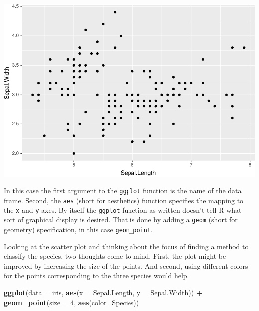 \documentclass[]{krantz}
\makeatletter
\newenvironment{Shaded}{\begin{snugshade}}{\end{snugshade}}
\newcommand{\DataTypeTok}[1]{\textcolor[rgb]{0.27,0.27,0.27}{#1}}
\newcommand{\DecValTok}[1]{\textcolor[rgb]{0.06,0.06,0.06}{#1}}
\newcommand{\KeywordTok}[1]{\textcolor[rgb]{0.27,0.27,0.27}{\textbf{#1}}}
\newcommand{\NormalTok}[1]{#1}
\newcommand{\OperatorTok}[1]{\textcolor[rgb]{0.43,0.43,0.43}{\textbf{#1}}}
\newcommand{\StringTok}[1]{\textcolor[rgb]{0.5,0.5,0.5}{#1}}
\newenvironment{kframe}{%
\medskip{}
\setlength{\fboxsep}{.8em}
 \def\at@end@of@kframe{}%
 \ifinner\ifhmode%
  \def\at@end@of@kframe{\end{minipage}}%
  \begin{minipage}{\columnwidth}%
 \fi\fi%
 \def\FrameCommand##1{\hskip\@totalleftmargin \hskip-\fboxsep
 \colorbox{shadecolor}{##1}\hskip-\fboxsep
     \hskip-\linewidth \hskip-\@totalleftmargin \hskip\columnwidth}%
 \MakeFramed {\advance\hsize-\width
   \@totalleftmargin\z@ \linewidth\hsize
   \@setminipage}}%
 {\par\unskip\endMakeFramed%
 \at@end@of@kframe}
\renewenvironment{Shaded}{\begin{kframe}}{\end{kframe}}
\makeatother
\begin{document}
\includegraphics{bookdown_files/figure-latex/unnamed-chunk-58-1.pdf}

In this case the first argument to the \texttt{ggplot} function is the name of the data frame. Second, the \texttt{aes} (short for aesthetics) function specifies the mapping to the \texttt{x} and \texttt{y} axes. By itself the \texttt{ggplot} function as written doesn't tell R what sort of graphical display is desired. That is done by adding a \texttt{geom} (short for geometry) specification, in this case \texttt{geom\_point}.

Looking at the scatter plot and thinking about the focus of finding a method to classify the species, two thoughts come to mind. First, the plot might be improved by increasing the size of the points. And second, using different colors for the points corresponding to the three species would help.

\begin{Shaded}
\begin{Highlighting}[]
\KeywordTok{ggplot}\NormalTok{(}\DataTypeTok{data =}\NormalTok{ iris, }\KeywordTok{aes}\NormalTok{(}\DataTypeTok{x =}\NormalTok{ Sepal.Length, }\DataTypeTok{y =}\NormalTok{ Sepal.Width)) }\OperatorTok{+}\StringTok{ }
\StringTok{    }\KeywordTok{geom_point}\NormalTok{(}\DataTypeTok{size =} \DecValTok{4}\NormalTok{, }\KeywordTok{aes}\NormalTok{(}\DataTypeTok{color=}\NormalTok{Species))}
\end{Highlighting}
\end{Shaded}
\end{document}
